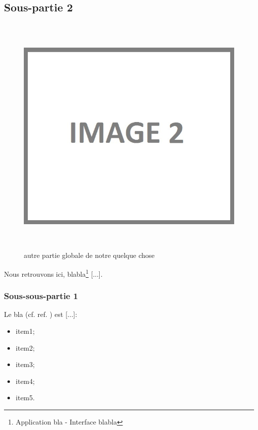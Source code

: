 \newpage{}

\subsection{Sous-partie 2}

\begin{figure}[!ht]
\begin{center}
\includegraphics[height=12cm]{autre_partie/image2}
\end{center}
\caption[autre partie]{autre partie globale de notre quelque chose}
\end{figure}

Nous retrouvons ici, blabla\footnote{Application bla - Interface blabla} [...].

\subsubsection{Sous-sous-partie 1}

Le bla (cf. ref. \cite{cite6}) est [...]:

\begin{itemize}
\item item1;
\item item2;
\item item3;
\item item4;
\item item5.
\end{itemize}


